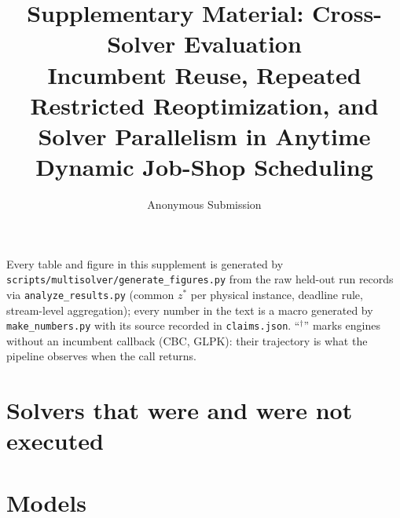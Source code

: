 \documentclass[10pt]{article}
\title{Supplementary Material: Cross-Solver Evaluation\\\large Incumbent Reuse, Repeated Restricted Reoptimization, and Solver Parallelism in Anytime Dynamic Job-Shop Scheduling}
\author{Anonymous Submission}
\date{}
\begin{document}
\maketitle

Every table and figure in this supplement is generated by \texttt{scripts/multisolver/generate\_figures.py} from the raw held-out run records via \texttt{analyze\_results.py} (common $z^*$ per physical instance, deadline rule, stream-level aggregation); every number in the text is a macro generated by \texttt{make\_numbers.py} with its source recorded in \texttt{claims.json}. ``$^\dagger$'' marks engines without an incumbent callback (CBC, GLPK): their trajectory is what the pipeline observes when the call returns.

\section{Solvers that were and were not executed}

\begin{table}[h]
\centering\footnotesize
\resizebox{\linewidth}{!}{}
\caption{Solver availability. ``Executed'' means the engine solved a smoke instance with outages, releases and commitments to the exhaustive-oracle optimum and the validator accepted the schedule. Free editions refuse models above their size cap; CP Optimizer, Gurobi and CPLEX therefore run only on the 8$\times$6 tier, and their paper-scale attempts are recorded as licence refusals, not as performance. MiniZinc is a modelling layer, not counted as a solver; its CP-SAT, CBC, HiGHS, SCIP, Gurobi and CPLEX back-ends duplicate engines reached natively and were not used.}
\end{table}

\section{Models}
\end{document}
